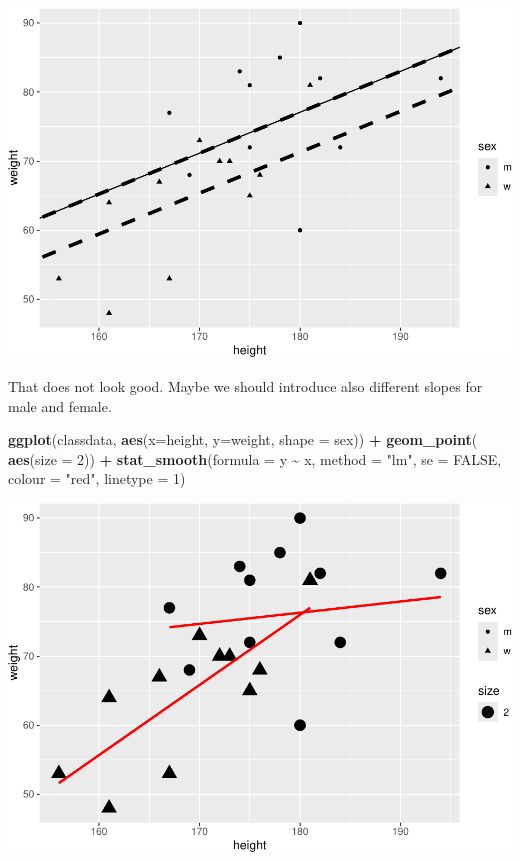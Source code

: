\documentclass[
  doc]{apa6}
\newenvironment{Shaded}{\begin{snugshade}}{\end{snugshade}}
\newcommand{\AttributeTok}[1]{\textcolor[rgb]{0.13,0.29,0.53}{#1}}
\newcommand{\ConstantTok}[1]{\textcolor[rgb]{0.56,0.35,0.01}{#1}}
\newcommand{\DecValTok}[1]{\textcolor[rgb]{0.00,0.00,0.81}{#1}}
\newcommand{\FunctionTok}[1]{\textcolor[rgb]{0.13,0.29,0.53}{\textbf{#1}}}
\newcommand{\NormalTok}[1]{#1}
\newcommand{\SpecialCharTok}[1]{\textcolor[rgb]{0.81,0.36,0.00}{\textbf{#1}}}
\newcommand{\StringTok}[1]{\textcolor[rgb]{0.31,0.60,0.02}{#1}}
\begin{document}
\includegraphics{rmd_reg_files/figure-latex/unnamed-chunk-12-1.pdf}

\newpage

That does not look good. Maybe we should introduce also different slopes for male and female.

\begin{Shaded}
\begin{Highlighting}[]
\FunctionTok{ggplot}\NormalTok{(classdata, }\FunctionTok{aes}\NormalTok{(}\AttributeTok{x=}\NormalTok{height, }\AttributeTok{y=}\NormalTok{weight, }\AttributeTok{shape =}\NormalTok{ sex)) }\SpecialCharTok{+}
  \FunctionTok{geom\_point}\NormalTok{( }\FunctionTok{aes}\NormalTok{(}\AttributeTok{size =} \DecValTok{2}\NormalTok{)) }\SpecialCharTok{+}
  \FunctionTok{stat\_smooth}\NormalTok{(}\AttributeTok{formula =}\NormalTok{ y }\SpecialCharTok{\textasciitilde{}}\NormalTok{ x,  }\AttributeTok{method =} \StringTok{"lm"}\NormalTok{, }
              \AttributeTok{se =} \ConstantTok{FALSE}\NormalTok{, }\AttributeTok{colour =} \StringTok{"red"}\NormalTok{, }\AttributeTok{linetype =} \DecValTok{1}\NormalTok{)}
\end{Highlighting}
\end{Shaded}

\includegraphics{rmd_reg_files/figure-latex/unnamed-chunk-13-1.pdf}
\end{document}
